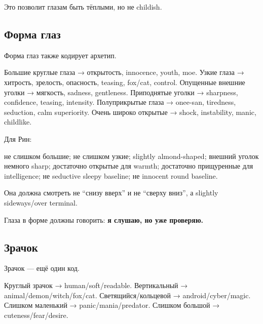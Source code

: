 Это позволит глазам быть тёплыми, но не childish.

\subsection*{Форма глаз}

Форма глаз также кодирует архетип.

Большие круглые глаза → открытость, innocence, youth, moe. Узкие глаза →
хитрость, зрелость, опасность, teasing, fox/\hspace{0pt}cat, control. Опущенные
внешние уголки → мягкость, sadness, gentleness. Приподнятые уголки →
sharpness, confidence, teasing, intensity. Полуприкрытые глаза →
onee-san, tiredness, seduction, calm superiority. Очень широко открытые
→ shock, instability, manic, childlike.

Для Рин:

не слишком большие; не слишком узкие; slightly almond-shaped; внешний
уголок немного sharp; достаточно открытые для warmth; достаточно
прищуренные для intelligence; не seductive sleepy baseline; не innocent
round baseline.

Она должна смотреть не ``снизу вверх'' и не ``сверху вниз'', а slightly
sideways/\hspace{0pt}over terminal.

Глаза в форме должны говорить: \textbf{я слушаю, но уже проверяю.}

\subsection*{Зрачок}

Зрачок --- ещё один код.

Круглый зрачок → human/\hspace{0pt}soft/\hspace{0pt}readable. Вертикальный →
animal/\hspace{0pt}demon/\hspace{0pt}witch/\hspace{0pt}fox/\hspace{0pt}cat. Светящийся/\hspace{0pt}кольцевой → android/\hspace{0pt}cyber/\hspace{0pt}magic.
Слишком маленький → panic/\hspace{0pt}mania/\hspace{0pt}predator. Слишком большой →
cuteness/\hspace{0pt}fear/\hspace{0pt}desire.

